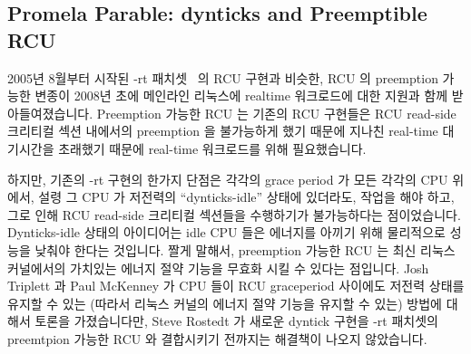 
\subsection{Promela Parable: dynticks and Preemptible RCU}
\label{sec:formal:Promela Parable: dynticks and Preemptible RCU}

2005년 8월부터 시작된 -rt 패치셋~\cite{IngoMolnar05a} 의 RCU 구현과 비슷한, RCU
의 preemption 가능한 변종이 2008년 초에 메인라인 리눅스에 realtime 워크로드에
대한 지원과 함께 받아들여졌습니다.
Preemption 가능한 RCU 는 기존의 RCU 구현들은 RCU read-side 크리티컬 섹션
내에서의 preemption 을 불가능하게 했기 때문에 지나친 real-time 대기시간을
초래했기 때문에 real-time 워크로드를 위해 필요했습니다.
\iffalse

In early 2008, a preemptible variant of RCU was accepted into
mainline Linux in support of real-time workloads,
a variant similar to the RCU implementations in
the -rt patchset~\cite{IngoMolnar05a}
since August 2005.
Preemptible RCU is needed for real-time workloads because older
RCU implementations disable preemption across RCU read-side
critical sections, resulting in excessive real-time latencies.
\fi

하지만, 기존의 -rt 구현의 한가지 단점은 각각의 grace period 가 모든 각각의 CPU
위에서, 설령 그 CPU 가 저전력의 ``dynticks-idle'' 상태에 있더라도, 작업을 해야
하고, 그로 인해 RCU read-side 크리티컬 섹션들을 수행하기가 불가능하다는
점이었습니다.
Dynticks-idle 상태의 아이디어는 idle CPU 들은 에너지를 아끼기 위해 물리적으로
성능을 낮춰야 한다는 것입니다.
짤게 말해서, preemption 가능한 RCU 는 최신 리눅스 커널에서의 가치있는 에너지
절약 기능을 무효화 시킬 수 있다는 점입니다.
Josh Triplett 과 Paul McKenney 가 CPU 들이 RCU graceperiod 사이에도 저전력
상태를 유지할 수 있는 (따라서 리눅스 커널의 에너지 절약 기능을 유지할 수 있는)
방법에 대해서 토론을 가졌습니다만, Steve Rostedt 가 새로운 dyntick 구현을 -rt
패치셋의 preemtpion 가능한 RCU 와 결합시키기 전까지는 해결책이 나오지
않았습니다.
\iffalse

However, one disadvantage of the older -rt implementation
was that each grace period
requires work to be done on each CPU, even if that CPU is in a low-power
``dynticks-idle'' state,
and thus incapable of executing RCU read-side critical sections.
The idea behind the dynticks-idle state is that idle CPUs
should be physically powered down in order to conserve energy.
In short, preemptible RCU can disable a valuable energy-conservation
feature of recent Linux kernels.
Although Josh Triplett and Paul McKenney
had discussed some approaches for allowing
CPUs to remain in low-power state throughout an RCU grace period
(thus preserving the Linux kernel's ability to conserve energy), matters
did not come to a head until Steve Rostedt integrated a new dyntick
implementation with preemptible RCU in the -rt patchset.
\fi

